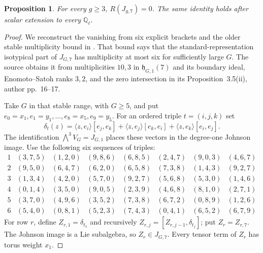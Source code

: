 \documentclass[11pt]{article}
\newtheorem{proposition}[theorem]{Proposition}
\theoremstyle{definition}\newtheorem{definition}[theorem]{Definition}
\begin{document}
\begin{proposition}\label{prop:johnson-seven-detector}
For every $g\geq3$, $R(J_{g,7})=0$. The same identity holds
after scalar extension to every $\mathbb Q_\ell$.
\end{proposition}
\begin{proof}
We reconstruct the vanishing from six explicit brackets and the
older stable multiplicity bound in
\cite[proof of Theorem~7.5(iv), author pp.~29--30]{MSS2015}.
That bound says that the standard-representation isotypical
part of $J_{G,7}$ has multiplicity at most six for sufficiently
large $G$. The source obtains it from multiplicities $10,3$
in $\mathfrak h_{G,1}(7)$ and its boundary ideal, Enomoto--Satoh
ranks $3,2$, and the zero intersection in its
Proposition~3.5(ii), author pp.~16--17.

Take $G$ in that stable range, with $G\geq5$, and put
$e_0=x_1,e_1=y_1,\ldots,e_8=x_5,e_9=y_5$.
For an ordered triple $t=(i,j,k)$ set
\[
 \delta_t(z)=\langle z,e_i\rangle[e_j,e_k]
       +\langle z,e_j\rangle[e_k,e_i]
       +\langle z,e_k\rangle[e_i,e_j].
\]
The identification $\bigwedge^3V_G=J_{G,1}$ places these
vectors in the degree-one Johnson image. Use the following
six sequences of triples:
\[
\begin{array}{c|lllllll}
1&(3,7,5)&(1,2,0)&(9,8,6)&(6,8,5)&(2,4,7)&(9,0,3)&(4,6,7)\\
2&(9,5,0)&(6,4,7)&(6,2,0)&(6,5,8)&(7,3,8)&(1,4,3)&(9,2,7)\\
3&(1,3,4)&(4,2,0)&(5,7,0)&(9,2,7)&(5,6,8)&(5,3,0)&(1,4,6)\\
4&(0,1,4)&(3,5,0)&(9,0,5)&(2,3,9)&(4,6,8)&(8,1,0)&(2,7,1)\\
5&(3,7,0)&(4,9,6)&(3,5,2)&(7,3,8)&(6,7,2)&(0,8,9)&(1,2,6)\\
6&(5,4,0)&(0,8,1)&(5,2,3)&(7,4,3)&(0,4,1)&(6,5,2)&(6,7,9)
\end{array}
\]
For row $r$, define $Z_{r,1}=\delta_{t_1}$ and recursively
$Z_{r,j}=[Z_{r,j-1},\delta_{t_j}]$; put $Z_r=Z_{r,7}$.
The Johnson image is a Lie subalgebra, so $Z_r\in J_{G,7}$.
Every tensor term of $Z_r$ has torus weight $x_1$.


\end{proof}
\end{document}
